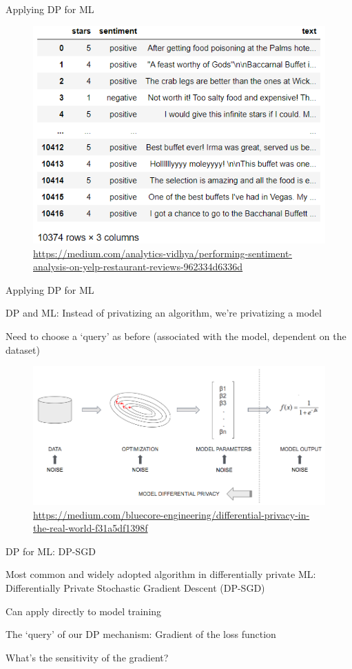 \documentclass[12pt,aspectratio=169]{beamer}
\begin{document}
\begin{frame}{Applying DP for ML}

\begin{figure}
    \centering
    \includegraphics[width=0.6\linewidth]{figures/YelpReviews.png}
    \caption{\tiny \url{https://medium.com/analytics-vidhya/performing-sentiment-analysis-on-yelp-restaurant-reviews-962334d6336d}}
\end{figure}

\end{frame}


\begin{frame}{Applying DP for ML}

DP and ML: Instead of privatizing an algorithm, we're privatizing a model

Need to choose a `query' as before (associated with the model, dependent on the dataset)

\begin{figure}
    \centering
    \includegraphics[width=0.65\linewidth]{figures/dp_dl.png}
    \caption{\tiny \url{https://medium.com/bluecore-engineering/differential-privacy-in-the-real-world-f31a5df1398f}}
\end{figure}

\end{frame}

\begin{frame}{DP for ML: DP-SGD}

Most common and widely adopted algorithm in differentially private ML: Differentially Private Stochastic Gradient Descent (DP-SGD)

Can apply directly to model training

The `query' of our DP mechanism: Gradient of the loss function

What's the sensitivity of the gradient?

\end{frame}
\end{document}
